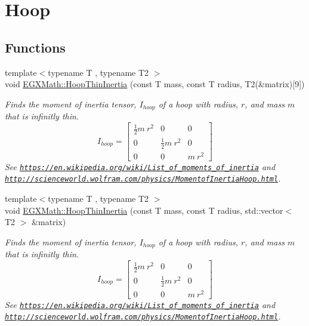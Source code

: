 \hypertarget{group___e_g_x_math-_geometry-3_d-_hoop}{}\section{Hoop}
\label{group___e_g_x_math-_geometry-3_d-_hoop}
\subsection*{Functions}
\begin{DoxyCompactItemize}
\item 
{\footnotesize template$<$typename T , typename T2 $>$ }\\void \mbox{\hyperlink{group___e_g_x_math-_geometry-3_d-_hoop_gab3a84dc2aa29ce0db990425747d291c6}{E\+G\+X\+Math\+::\+Hoop\+Thin\+Inertia}} (const T mass, const T radius, T2(\&matrix)\mbox{[}9\mbox{]})
\begin{DoxyCompactList}\small\item\em Finds the moment of inertia tensor, $I_{hoop}$ of a hoop with radius, $r$, and mass $m$ that is infinitly thin. \[ I_{hoop}=\begin{bmatrix} \frac{1}{2}m\ r^2 & 0 & 0\\ 0 & \frac{1}{2}m\ r^2 & 0\\ 0 & 0 & m\ r^2 \end{bmatrix} \] See \href{https://en.wikipedia.org/wiki/List_of_moments_of_inertia}{\tt https\+://en.\+wikipedia.\+org/wiki/\+List\+\_\+of\+\_\+moments\+\_\+of\+\_\+inertia} and \href{http://scienceworld.wolfram.com/physics/MomentofInertiaHoop.html}{\tt http\+://scienceworld.\+wolfram.\+com/physics/\+Momentof\+Inertia\+Hoop.\+html}. \end{DoxyCompactList}\item 
{\footnotesize template$<$typename T , typename T2 $>$ }\\void \mbox{\hyperlink{group___e_g_x_math-_geometry-3_d-_hoop_ga0bc0b59dbaad05d7dd184d710f99b199}{E\+G\+X\+Math\+::\+Hoop\+Thin\+Inertia}} (const T mass, const T radius, std\+::vector$<$ T2 $>$ \&matrix)
\begin{DoxyCompactList}\small\item\em Finds the moment of inertia tensor, $I_{hoop}$ of a hoop with radius, $r$, and mass $m$ that is infinitly thin. \[ I_{hoop}=\begin{bmatrix} \frac{1}{2}m\ r^2 & 0 & 0\\ 0 & \frac{1}{2}m\ r^2 & 0\\ 0 & 0 & m\ r^2 \end{bmatrix} \] See \href{https://en.wikipedia.org/wiki/List_of_moments_of_inertia}{\tt https\+://en.\+wikipedia.\+org/wiki/\+List\+\_\+of\+\_\+moments\+\_\+of\+\_\+inertia} and \href{http://scienceworld.wolfram.com/physics/MomentofInertiaHoop.html}{\tt http\+://scienceworld.\+wolfram.\+com/physics/\+Momentof\+Inertia\+Hoop.\+html}. \end{DoxyCompactList}\item 

\end{DoxyCompactItemize}
